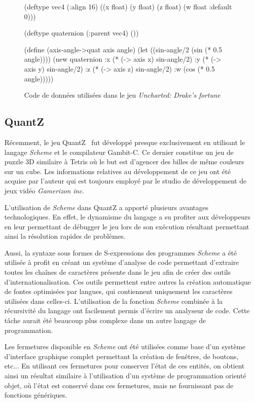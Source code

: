 \documentclass[12pt,twoside,letterpaper,francais]{book}
\newcommand{\Schemelang}{{\textit{Scheme }}}
\newcommand{\scheme}[1]{\selectlanguage{english}{\tt #1}\selectlanguage{french}}
\begin{document}
\begin{figure}[htb!]
  \begin{schemecode}
(deftype vec4 (:align 16)
  ((x float) (y float)
   (z float) (w float :default 0)))

(deftype quaternion (:parent vec4) ())

(define (axis-angle->quat axis angle)
 (let ((sin-angle/2 (sin (* 0.5 angle))))
  (new quaternion
       :x (* (-> axis x) sin-angle/2)
       :y (* (-> axis y) sin-angle/2)
       :z (* (-> axis z) sin-angle/2)
       :w (cos (* 0.5 angle)))))
  \end{schemecode}
  \caption{Code de données utilisées dans le jeu \textit{Uncharted:
      Drake's fortune}~\cite{ND_DRAKE}}
  \label{Rev:Drake}
\end{figure}


\FloatBarrier
\subsection{QuantZ}
Récemment, le jeu QuantZ~\cite{Quantz} fut développé presque
exclusivement en utilisant le langage \Schemelang et le compilateur
Gambit-C. Ce dernier constitue un jeu de puzzle 3D similaire à Tetris
où le but est d'agencer des billes de même couleurs sur un cube. Les
informations relatives au développement de ce jeu ont été acquise par
l'auteur qui est toujours employé par le studio de développement de
jeux vidéo \textit{Gamerizon inc}.

L'utilisation de \Schemelang dans QuantZ a apporté plusieurs avantages
technologiques. En effet, le dynamisme du langage a su profiter aux
développeurs en leur permettant de débugger le jeu lors de son
exécution résultant permettant ainsi la résolution rapides de
problèmes.

Aussi, la syntaxe sous formes de S-expressions des programmes
\Schemelang a été utilisée à profit en créant un système d'analyse de
code permettant d'extraire toutes les chaînes de caractères présente
dans le jeu afin de créer des outils d'internationalisation. Ces
outils permettent entre autres la création automatique de fontes
optimisées par langues, qui contiennent uniquement les caractères
utilisées dans celles-ci. L'utilisation de la fonction \Schemelang
\scheme{read} combinée à la récursivité du langage ont facilement
permis d'écrire un analyseur de code. Cette tâche aurait été beaucoup
plus complexe dans un autre langage de programmation.

Les fermetures disponible en \Schemelang ont été utilisées comme base d'un
système d'interface graphique complet permettant la création de
fenêtres, de boutons, etc... En utilisant ces fermetures pour
conserver l'état de ces entités, on obtient ainsi un résultat
similaire à l'utilisation d'un système de programmation orienté objet,
où l'état est conservé dans ces fermetures, mais ne fournissant pas de
fonctions génériques.
\end{document}
